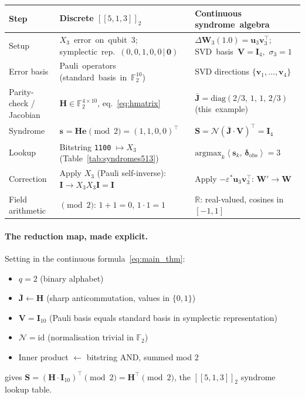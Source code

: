 \documentclass[11pt,a4paper]{article}
\theoremstyle{definition}
\newcommand{\Wm}{\mathbf{W}}
\newcommand{\Vm}{\mathbf{V}}
\newcommand{\Sm}{\mathbf{S}}
\newcommand{\Jm}{\mathbf{J}}
\newcommand{\Hm}{\mathbf{H}}
\newcommand{\Imat}{\mathbf{I}}
\newcommand{\vk}[1][]{\mathbf{v}_{#1}}
\newcommand{\uk}[1][]{\mathbf{u}_{#1}}
\newcommand{\sk}[1][]{\mathbf{s}_{#1}}
\newcommand{\ek}[1][]{\mathbf{e}_{#1}}
\newcommand{\Rbb}{\mathbb{R}}
\newcommand{\Fbb}{\mathbb{F}}
\newcommand{\Nop}{\mathcal{N}}
\newcommand{\inner}[2]{\left\langle#1,\,#2\right\rangle}
\begin{document}
\begin{center}
\renewcommand{\arraystretch}{1.4}
\begin{tabular}{p{2.4cm} p{5.6cm} | p{5.6cm}}
\toprule
\textbf{Step} & \textbf{Discrete $[\![5,1,3]\!]_2$} &
\textbf{Continuous \mbox{syndrome algebra}} \\
\midrule
Setup &
\mbox{$X_3$ error on qubit 3;} \mbox{symplectic rep.\ $(0,0,1,0,0\,|\,\mathbf{0})$} &
\mbox{$\Delta\Wm_3(1.0) = \uk[3]\vk[3]^\top$;}
\mbox{SVD basis $\Vm = \Imat_4$, $\sigma_3 = 1$} \\
\midrule
Error basis &
\mbox{Pauli operators} \mbox{(standard basis in $\Fbb_2^{10}$)} &
SVD directions $\{\vk[1],\ldots,\vk[4]\}$ \\
\midrule
Parity-check / Jacobian &
$\Hm\in\Fbb_2^{4\times 10}$, eq.~\eqref{eq:hmatrix} &
\mbox{$\bar{\Jm} = \mathrm{diag}(2/3,\,1,\,1,\,2/3)$} \mbox{(this example)} \\
\midrule
Syndrome &
$\sk = \Hm\ek\pmod 2 = (1,1,0,0)^\top$ &
$\Sm = \Nop(\bar{\Jm}\cdot\Vm)^\top = \Imat_4$ \\
\midrule
Lookup &
Bitstring \texttt{1100} $\mapsto X_3$ (Table~\ref{tab:syndromes513}) &
$\mathrm{argmax}_k\inner{\sk[k]}{\boldsymbol{\delta}_{\mathrm{obs}}} = 3$ \\
\midrule
Correction &
Apply $X_3$ (Pauli self-inverse): $\Imat\to X_3 X_3\Imat = \Imat$ &
Apply $-\varepsilon^*\uk[3]\vk[3]^\top$: $\Wm' \to \Wm$ \\
\midrule
Field \mbox{arithmetic} &
$\pmod 2$: $1+1 = 0$, $1\cdot 1 = 1$ &
$\Rbb$: real-valued, cosines in $[-1, 1]$ \\
\bottomrule
\end{tabular}
\end{center}

\paragraph{The reduction map, made explicit.}
Setting in the continuous formula~\eqref{eq:main_thm}:
\begin{itemize}[nosep]
  \item $q = 2$ (binary alphabet)
  \item $\bar{\Jm} \leftarrow \Hm$ (sharp anticommutation, values
    in $\{0,1\}$)
  \item $\Vm = \Imat_{10}$ (Pauli basis equals standard basis in
    symplectic representation)
  \item $\Nop = \mathrm{id}$ (normalisation trivial in $\Fbb_2$)
  \item Inner product $\leftarrow$ bitstring AND, summed mod $2$
\end{itemize}
gives $\Sm = (\Hm \cdot \Imat_{10})^\top \pmod 2 = \Hm^\top \pmod 2$,
the $[\![5,1,3]\!]_2$ syndrome lookup table.
\end{document}
